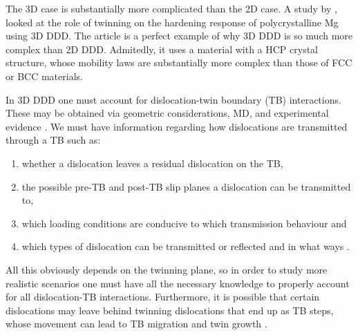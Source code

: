 The 3D case is substantially more complicated than the 2D case. A study by \citet{twinning}, looked at the role of twinning on the hardening response of polycrystalline Mg using 3D DDD. The article is a perfect example of why 3D DDD is so much more complex than 2D DDD. Admitedly, it uses a material with a HCP crystal structure, whose mobility laws are substantially more complex than those of FCC or BCC materials.

In 3D DDD one must account for dislocation-twin boundary (TB) interactions. These may be obtained via geometric considerations, MD, and experimental evidence \cite{twinning2,twinning3,twinning4,twinning5}. We must have information regarding how dislocations are transmitted through a TB such as:
\begin{enumerate}
  \item whether a dislocation leaves a residual dislocation on the TB,
  \item the possible pre-TB and post-TB slip planes a dislocation can be transmitted to,
  \item which loading conditions are conducive to which transmission behaviour and
  \item which types of dislocation can be transmitted or reflected and in what ways \cite{twinning}.
\end{enumerate}
All this obviously depends on the twinning plane, so in order to study more realistic scenarios one must have all the necessary knowledge to properly account for all dislocation-TB interactions. Furthermore, it is possible that certain dislocations may leave behind twinning dislocations that end up as TB steps, whose movement can lead to TB migration and twin growth \cite{twinning6, twinning7}.

